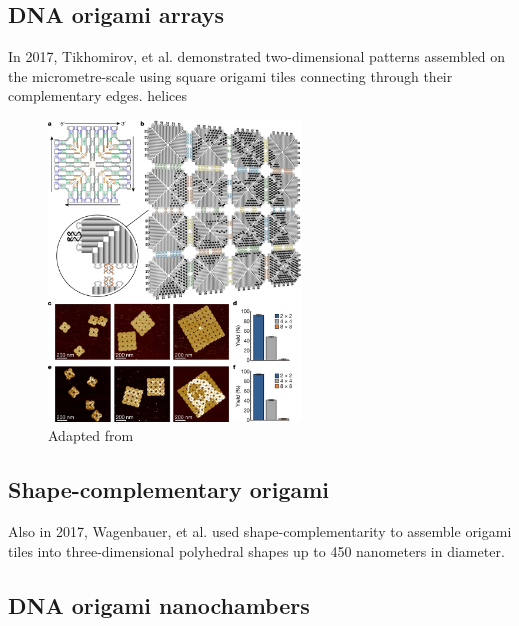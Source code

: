 \subsection{DNA origami arrays}\label{sec:origamiArrays}

In 2017, Tikhomirov, et al.\cite{tikhomirov2017fractal} demonstrated two-dimensional patterns assembled on the micrometre-scale using square origami tiles connecting through their complementary edges. helices

\begin{figure}[h]
  \centering\includegraphics[width=0.6\textwidth]{figures/monalisa_tiles.png}
  \caption{Adapted from \cite{tikhomirov2017fractal}}
\end{figure}

\subsection{Shape-complementary origami}

Also in 2017, Wagenbauer, et al. \cite{wagenbauer2017gigadalton} used shape-complementarity to assemble origami tiles into three-dimensional polyhedral shapes up to 450 nanometers in diameter.


\subsection{DNA origami nanochambers}

